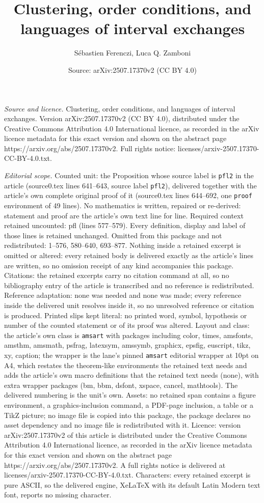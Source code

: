 \documentclass[10pt,a4paper]{amsart}
\title[Clustering, order conditions, and languages of interval exch]{Clustering, order conditions, and languages of interval exchanges}
\author{S\'ebastien Ferenczi, Luca Q. Zamboni}
\date{Source: arXiv:2507.17370v2 (CC BY 4.0)}
\begin{document}
\maketitle

\noindent\emph{Source and licence.} Clustering, order conditions, and languages of interval exchanges. Version arXiv:2507.17370v2 (CC BY 4.0), distributed under the Creative Commons Attribution 4.0 International licence, as recorded in the arXiv licence metadata for this exact version and shown on the abstract page https://arxiv.org/abs/2507.17370v2. Full rights notice: licenses/arxiv-2507.17370-CC-BY-4.0.txt.\par\smallskip

\noindent\textit{Editorial scope.} Counted unit: the Proposition whose source label is \texttt{pfl2} in the article (source0.tex lines 641--643, source label \texttt{pfl2}), delivered together with the article's own complete original proof of it (source0.tex lines 644--692, one \texttt{proof} environment of 49 lines). No mathematics is written, repaired or re-derived: statement and proof are the article's own text line for line. Required context retained uncounted: pfl (lines 577--579). Every definition, display and label of those lines is retained unchanged. Omitted from this package and not redistributed: 1--576, 580--640, 693--877. Nothing inside a retained excerpt is omitted or altered: every retained body is delivered exactly as the article's lines are written, so no omission receipt of any kind accompanies this package. Citations: the retained excerpts carry no citation command at all, so no bibliography entry of the article is transcribed and no reference is redistributed. Reference adaptation: none was needed and none was made; every reference inside the delivered unit resolves inside it, so no unresolved reference or citation is produced. Printed slips kept literal: no printed word, symbol, hypothesis or number of the counted statement or of its proof was altered. Layout and class: the article's own class is \texttt{amsart} with packages including color, times, amsfonts, amsthm, amsmath, psfrag, latexsym, amssymb, graphicx, epsfig, euscript, tikz, xy, caption; the wrapper is the lane's pinned \texttt{amsart} editorial wrapper at 10pt on A4, which restates the theorem-like environments the retained text needs and adds the article's own macro definitions that the retained text needs (none), with extra wrapper packages (bm, bbm, dsfont, xspace, cancel, mathtools). The delivered numbering is the unit's own. Assets: no retained span contains a figure environment, a graphics-inclusion command, a PDF-page inclusion, a table or a TikZ picture; no image file is copied into this package, the package declares no asset dependency and no image file is redistributed with it. Licence: version arXiv:2507.17370v2 of this article is distributed under the Creative Commons Attribution 4.0 International licence, as recorded in the arXiv licence metadata for this exact version and shown on the abstract page https://arxiv.org/abs/2507.17370v2. A full rights notice is delivered at licenses/arxiv-2507.17370-CC-BY-4.0.txt. Characters: every retained excerpt is pure ASCII, so the delivered engine, XeLaTeX with its default Latin Modern text font, reports no missing character.
\end{document}
